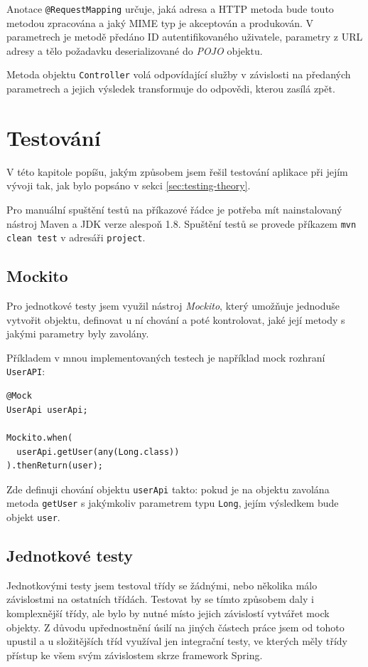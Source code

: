 \documentclass[thesis=B,czech]{FITthesis}[2012/06/26]
\begin{document}
	Anotace \texttt{@RequestMapping} určuje, jaká adresa a HTTP metoda bude touto metodou zpracována a jaký MIME typ \cite{mime-type} je akceptován a produkován. V parametrech je metodě předáno ID autentifikovaného uživatele, parametry z URL adresy a tělo požadavku deserializované do \textit{POJO} objektu. 
	
	Metoda objektu \texttt{Controller} volá odpovídající služby v závislosti na předaných parametrech a jejich výsledek transformuje do odpovědi, kterou zasílá zpět.
	


\chapter{Testování}
	\label{chapter:testing}
	
	V této kapitole popíšu, jakým způsobem jsem řešil testování aplikace při jejím vývoji tak, jak bylo popsáno v sekci \ref{sec:testing-theory}. 

	Pro manuální spuštění testů na příkazové řádce je potřeba mít nainstalovaný nástroj Maven a JDK verze alespoň 1.8. Spuštění testů se provede příkazem \texttt{mvn clean test} v adresáři \texttt{project}.
	
	\section{Mockito}
		Pro jednotkové testy jsem využil nástroj \textit{Mockito}, který umožňuje jednoduše vytvořit  objektu, definovat u ní chování a poté kontrolovat, jaké její metody s jakými parametry byly zavolány.
			
			Příkladem  v mnou implementovaných testech je například mock rozhraní \texttt{UserAPI}:
			\begin{Verbatim}
@Mock
UserApi userApi;

Mockito.when(
  userApi.getUser(any(Long.class))
).thenReturn(user);
			\end{Verbatim}
			Zde definuji chování objektu \texttt{userApi} takto: pokud je na objektu zavolána metoda \texttt{getUser} s jakýmkoliv parametrem typu \texttt{Long}, jejím výsledkem bude objekt \texttt{user}.
		
		
	\section{Jednotkové testy}
		Jednotkovými testy jsem testoval třídy se žádnými, nebo několika málo závislostmi na ostatních třídách. Testovat by se tímto způsobem daly i komplexnější třídy, ale bylo by nutné místo jejich závislostí vytvářet mock objekty. Z důvodu upřednostnění úsilí na jiných částech práce jsem od tohoto upustil a u složitějších tříd využíval jen integrační testy, ve kterých měly třídy přístup ke všem svým závislostem skrze framework Spring.
	
\end{document}
